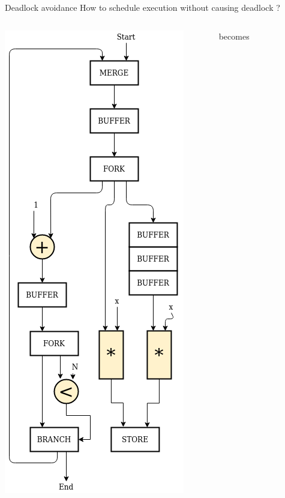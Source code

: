\documentclass{beamer}
\begin{document}
\begin{frame}{Deadlock avoidance}
  How to schedule execution without causing deadlock ?
  \begin{columns}[T]
    \begin{column}{0.25\textwidth}
      \includegraphics[scale=0.25]{blocking_unshared.png}
    \end{column}
    \begin{column}{0.1\textwidth}
    \begin{center}
        becomes
    \end{center}
    \end{column}
    \begin{column}{0.25\textwidth}

\end{column}
\end{columns}
\end{frame}
\end{document}

